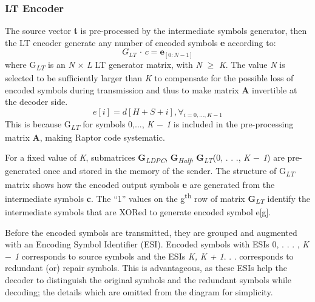 \subsubsection{LT Encoder}
\label{lt}
The source vector \textbf{t} is pre-processed by the intermediate symbols generator, then the LT encoder generate any number of encoded symbols \textbf{e} according to:
\begin{equation}
G_{LT}{\,\cdot\,}c = \textbf{e}_{[0:N - 1]}
\end{equation}
where G\textsubscript{\textit{LT}} is an  \textit{N} $\times$ \textit{L} LT generator matrix, with \textit{N} $\geq$ \textit{K}. The value \textit{N} is selected to be sufficiently larger than \textit{K} to compensate for the possible loss of encoded symbols during transmission and thus to make matrix \textbf{A} invertible at the decoder side. 
\begin{equation}
e[i] = d[H + S + i], \forall_{i=0,...,K - 1}
\end{equation}
This is because G\textsubscript{\textit{LT}} for symbols 0,..., \textit{K $-$ 1} is included in the pre-processing matrix \textbf{A}, making Raptor code systematic. 
\par
For a fixed value of \textit{K}, submatrices \textbf{G}\textsubscript{\textit{LDPC}}, \textbf{G}\textsubscript{\textit{Half}}, \textbf{G}\textsubscript{\textit{LT}}(0, . . ., \textit{K $-$ 1}) are pre-generated once and stored in the memory of the sender. The structure of G\textsubscript{\textit{LT}} matrix shows how the encoded output symbols \textbf{e} are generated from the intermediate symbols \textbf{c}. The \enquote{1} values on the g\textsuperscript{th} row of matrix \textbf{G}\textsubscript{\textit{LT}} identify the intermediate symbols that are XORed to generate encoded symbol e[g].
\par
Before the encoded symbols are transmitted, they are grouped and augmented with an Encoding Symbol Identifier (ESI). Encoded symbols with ESIs 0, . . . , \textit{K $-$ 1} corresponds to source symbols and the ESIs \textit{K, K + 1}. . . corresponds to redundant (or) repair symbols. This is advantageous, as these ESIs help the decoder to distinguish the original symbols and the redundant symbols while decoding; the details which are omitted from the diagram for simplicity. 

